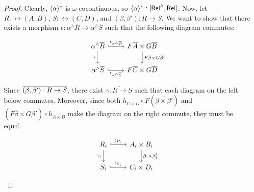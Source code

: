 \documentclass[runningheads]{llncs}
\begin{document}
\begin{proof}
Clearly, $\langle {\alpha} \rangle^*$ is $\omega$-cocontinuous, so
$\langle {\alpha} \rangle^* : [\mathsf{Rel}^k,\mathsf{Rel}]$. Now, let $\overline{R :
  \rel(A, B)}$, $\overline{S : \rel(C, D)}$, and $\overline{(\beta,
  \beta') : R \to S}$. We want to show that there exists a morphism
$\epsilon : \alpha^\wedge\overline{R} \to \alpha^\wedge\overline{S}$
such that the following  diagram commutes:
\begin{figure*}[ht]
\vspace*{-0.3in}
  \hspace*{1.5in}
  \begin{minipage}[b]{0.25\linewidth}
 {\small    \[
    \begin{tikzcd}
        \alpha^\wedge\overline{R}
        \ar[r, hookrightarrow, "{\iota_{\alpha^\wedge\overline{R}}}"]
        \ar[d, "{\epsilon}"']
        & F\overline{A} \times G\overline{B}
        \ar[d, "{F\overline{\beta} \times G\overline{\beta'}}"] \\
        \alpha^\wedge\overline{S}
        \ar[r, hookrightarrow, "{\iota_{\alpha^\wedge\overline{S}}}"']
        & F\overline{C} \times G\overline{D}
    \end{tikzcd}
    \]}
\end{minipage}\vspace*{-0.3in}
\end{figure*}
\noindent
Since $\overline{(\beta,\beta') : R \to S}$, there exist $\overline{\gamma :
  R \to S}$ such that each diagram on the left below commutes.  Moreover,
since both $h_{\overline{C \times D}} \circ F(\overline{\beta \times
  \beta'})$ and $(F\overline{\beta} \times G\overline{\beta'}) \circ
h_{\overline{A \times B}}$ make the diagram on the right commute, they
must be equal.
\begin{figure*}[ht]
\vspace*{-0.3in}
  \hspace*{0.3in}
\begin{minipage}[b]{0.25\linewidth}
{\small    \[
    \begin{tikzcd}
        R_i
        \ar[d, "{\gamma_i}"']
        \ar[r, hookrightarrow, "{\iota_{R_i}}"]
        &A_i \times B_i
        \ar[d, "{\beta_i \times \beta'_i}"] \\
        S_i
        \ar[r, hookrightarrow, "{\iota_{S_i}}"]
        &C_i \times D_i
    \end{tikzcd}
    \]}
\end{minipage}\hspace*{0.3in}
\begin{minipage}[b]{0.25\linewidth}

\end{minipage}
\end{figure*}
\end{proof}
\end{document}
